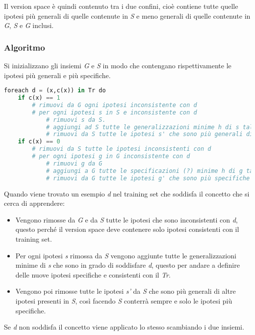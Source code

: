 Il version space è quindi contenuto tra i due confini, cioè contiene
tutte quelle ipotesi più generali di quelle contenute in \emph{S} e meno
generali di quelle contenute in \emph{G}, \emph{S} e \emph{G} inclusi.

\subsubsection{Algoritmo}\label{algoritmo}

Si inizializzano gli insiemi \emph{G} e \emph{S} in modo che contengano
rispettivamente le ipotesi più generali e più specifiche.

\begin{lstlisting}[language=python, caption=Canditate Eliminatio]
foreach d = (x,c(x)) in Tr do
    if c(x) == 1
        # rimuovi da G ogni ipotesi inconsistente con d
        # per ogni ipotesi s in S e inconsistente con d
            # rimuovi s da S.
            # aggiungi ad S tutte le generalizzazioni minime h di s tali che sono consistenti con d ed esiste un altra ipotesi g in G più generale di h.
            # rimuovi da S tutte le ipotesi s' che sono più generali di altre ipotesi in S.
    if c(x) == 0
        # rimuovi da S tutte le ipotesi inconsistenti con d
        # per ogni ipotesi g in G inconsistente con d
            # rimuovi g da G
            # aggiungi a G tutte le specificazioni (?) minime h di g tali che siano consistenti con d e che esiste un'altra ipotesi s in S più specifica di h.
            # rimuovi da G tutte le ipotesi g' che sono più specifiche di altre ipotesi in G.
\end{lstlisting}

Quando viene trovato un esempio \emph{d} nel training set che soddisfa
il concetto che si cerca di apprendere:

\begin{itemize}
\item
  Vengono rimosse da \emph{G} e da \emph{S} tutte le ipotesi che sono
  inconsistenti con \emph{d}, questo perché il version space deve
  contenere solo ipotesi consistenti con il training set.
\item
  Per ogni ipotesi \emph{s} rimossa da \emph{S} vengono aggiunte tutte
  le generalizzazioni minime di \emph{s} che sono in grado di soddisfare
  \emph{d}, questo per andare a definire delle nuove ipotesi specifiche
  e consistenti con il \textit{Tr}.
\item
  Vengono poi rimosse tutte le ipotesi \emph{s'} da \emph{S} che sono
  più generali di altre ipotesi presenti in \emph{S}, così facendo
  \emph{S} conterrà sempre e solo le ipotesi più specifiche.
\end{itemize}

Se \emph{d} non soddisfa il concetto viene applicato lo stesso
scambiando i due insiemi.
